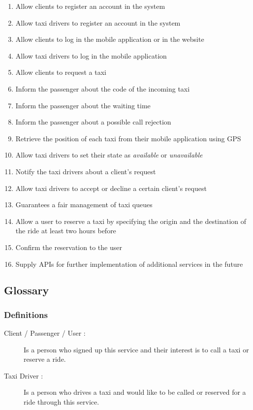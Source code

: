 \documentclass[a4paper]{article}
\begin{document}
\begin{enumerate}[label=\bfseries G\arabic*:]
\item Allow clients to register an account in the system
\item Allow taxi drivers to register an account in the system
\item Allow clients to log in the mobile application or in the website
\item Allow taxi drivers to log in the mobile application
\item Allow clients to request a taxi
\item Inform the passenger about the code of the incoming taxi
\item Inform the passenger about the waiting time
\item Inform the passenger about a possible call rejection
\item Retrieve the position of each taxi from their mobile application using GPS
\item Allow taxi drivers to set their state as \emph{available} or \emph{unavailable}
\item Notify the taxi drivers about a client's request
\item Allow taxi drivers to accept or decline a certain client's request
\item Guarantees a fair management of taxi queues
\item Allow a user to reserve a taxi by specifying the origin and the destination of the ride at least two hours before
\item Confirm the reservation to the user
\item Supply APIs for further implementation of additional services in the future
\end{enumerate}

\subsection{Glossary}
\subsubsection{Definitions}
\begin{description}
\item[Client / Passenger / User :] Is a person who signed up this service and their interest is to call a taxi or reserve  a ride.
\item[Taxi Driver :] Is a person who drives a taxi and would like to be called or reserved for a ride through this service.
\end{description}
\end{document}
